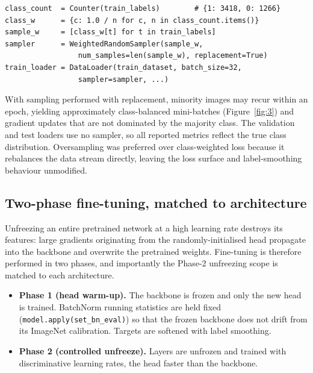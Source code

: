 \documentclass[11pt,a4paper]{article}
\numberwithin{figure}{section}
\numberwithin{table}{section}
\begin{document}
\begin{lstlisting}
class_count  = Counter(train_labels)        # {1: 3418, 0: 1266}
class_w      = {c: 1.0 / n for c, n in class_count.items()}
sample_w     = [class_w[t] for t in train_labels]
sampler      = WeightedRandomSampler(sample_w,
                 num_samples=len(sample_w), replacement=True)
train_loader = DataLoader(train_dataset, batch_size=32,
                 sampler=sampler, ...)
\end{lstlisting}

With sampling performed with replacement, minority images may recur within an epoch, yielding
approximately class-balanced mini-batches (Figure~\ref{fig:3}) and gradient updates that are not
dominated by the majority class. The validation and test loaders use no sampler, so all reported metrics
reflect the true class distribution. Oversampling was preferred over class-weighted loss because it
rebalances the data stream directly, leaving the loss surface and label-smoothing behaviour unmodified.

\subsection{Two-phase fine-tuning, matched to architecture}
\label{sec:finetune}
Unfreezing an entire pretrained network at a high learning rate destroys its features: large gradients
originating from the randomly-initialised head propagate into the backbone and overwrite the pretrained
weights. Fine-tuning is therefore performed in two phases, and importantly the Phase-2 unfreezing
scope is matched to each architecture.
\begin{itemize}
\item \textbf{Phase 1 (head warm-up).} The backbone is frozen and only the new head is trained.
BatchNorm \cite{batchnorm} running statistics are held fixed (\texttt{model.apply(set\_bn\_eval)}) so
that the frozen backbone does not drift from its ImageNet calibration. Targets are softened with label
smoothing.
\item \textbf{Phase 2 (controlled unfreeze).} Layers are unfrozen and trained with discriminative
learning rates, the head faster than the backbone.
\end{itemize}
\end{document}
